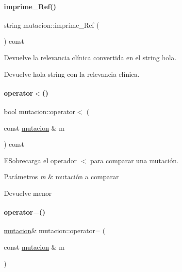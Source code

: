 \paragraph{\texorpdfstring{imprime\+\_\+\+Ref()}{imprime\_Ref()}}
{\footnotesize\ttfamily string mutacion\+::imprime\+\_\+\+Ref (\begin{DoxyParamCaption}{ }\end{DoxyParamCaption}) const}



Devuelve la relevancia clínica convertida en el string hola. 

\begin{DoxyReturn}{Devuelve}
hola string con la relevancia clínica. 
\end{DoxyReturn}
\hypertarget{classmutacion_a5619b00cf3de4fc510c081d2d1841cd2}{}\label{classmutacion_a5619b00cf3de4fc510c081d2d1841cd2} 
\paragraph{\texorpdfstring{operator$<$()}{operator<()}}
{\footnotesize\ttfamily bool mutacion\+::operator$<$ (\begin{DoxyParamCaption}\item[{const \hyperlink{classmutacion}{mutacion} \&}]{m }\end{DoxyParamCaption}) const}



E\+Sobrecarga el operador $<$ para comparar una mutación. 


\begin{DoxyParams}{Parámetros}
{\em m} & mutación a comparar \\
\hline
\end{DoxyParams}
\begin{DoxyReturn}{Devuelve}
menor 
\end{DoxyReturn}
\hypertarget{classmutacion_aa38c36e397000cbef22a5933f56d59ed}{}\label{classmutacion_aa38c36e397000cbef22a5933f56d59ed} 
\paragraph{\texorpdfstring{operator=()}{operator=()}}
{\footnotesize\ttfamily \hyperlink{classmutacion}{mutacion}\& mutacion\+::operator= (\begin{DoxyParamCaption}\item[{const \hyperlink{classmutacion}{mutacion} \&}]{m }\end{DoxyParamCaption})}



